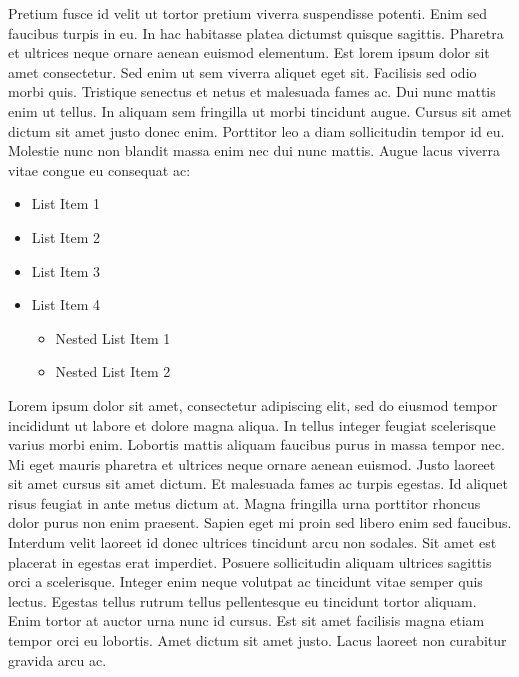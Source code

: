 \documentclass{article}
\begin{document}
Pretium fusce id velit ut tortor pretium viverra suspendisse potenti. Enim sed faucibus turpis in eu. In hac habitasse platea dictumst quisque sagittis. Pharetra et ultrices neque ornare aenean euismod elementum. Est lorem ipsum dolor sit amet consectetur. Sed enim ut sem viverra aliquet eget sit. Facilisis sed odio morbi quis. Tristique senectus et netus et malesuada fames ac. Dui nunc mattis enim ut tellus. In aliquam sem fringilla ut morbi tincidunt augue. Cursus sit amet dictum sit amet justo donec enim. Porttitor leo a diam sollicitudin tempor id eu. Molestie nunc non blandit massa enim nec dui nunc mattis. Augue lacus viverra vitae congue eu consequat ac: 
\begin{itemize}
       \item[1] List Item 1
       \item[2] List Item 2
       \item[3] List Item 3
       \item[4] List Item 4
           \begin{itemize}
           \item[4.1] Nested List Item 1
           \item[4.2] Nested List Item 2
           \end{itemize}
\end{itemize}
Lorem ipsum dolor sit amet, consectetur adipiscing elit, sed do eiusmod tempor incididunt ut labore et dolore magna aliqua. In tellus integer feugiat scelerisque varius morbi enim. Lobortis mattis aliquam faucibus purus in massa tempor nec. Mi eget mauris pharetra et ultrices neque ornare aenean euismod. Justo laoreet sit amet cursus sit amet dictum. Et malesuada fames ac turpis egestas. Id aliquet risus feugiat in ante metus dictum at. Magna fringilla urna porttitor rhoncus dolor purus non enim praesent. Sapien eget mi proin sed libero enim sed faucibus. Interdum velit laoreet id donec ultrices tincidunt arcu non sodales. Sit amet est placerat in egestas erat imperdiet. Posuere sollicitudin aliquam ultrices sagittis orci a scelerisque. Integer enim neque volutpat ac tincidunt vitae semper quis lectus. Egestas tellus rutrum tellus pellentesque eu tincidunt tortor aliquam. Enim tortor at auctor urna nunc id cursus. Est sit amet facilisis magna etiam tempor orci eu lobortis. Amet dictum sit amet justo. Lacus laoreet non curabitur gravida arcu ac.
\end{document}

